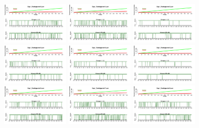 \begin{figure}[th]
\includegraphics[width=0.30\textwidth]{Figures/Success_Exp1_P10} \includegraphics[width=0.30\textwidth]{Figures/Success_Exp1_P11} \includegraphics[width=0.30\textwidth]{Figures/Success_Exp1_P12}
\includegraphics[width=0.30\textwidth]{Figures/Success_Exp1_P13} \includegraphics[width=0.30\textwidth]{Figures/Success_Exp1_P14} \includegraphics[width=0.30\textwidth]{Figures/Success_Exp1_P15}
\includegraphics[width=0.30\textwidth]{Figures/Success_Exp1_P16} \includegraphics[width=0.30\textwidth]{Figures/Success_Exp1_P17} \includegraphics[width=0.30\textwidth]{Figures/Success_Exp1_P18}

\end{figure}
